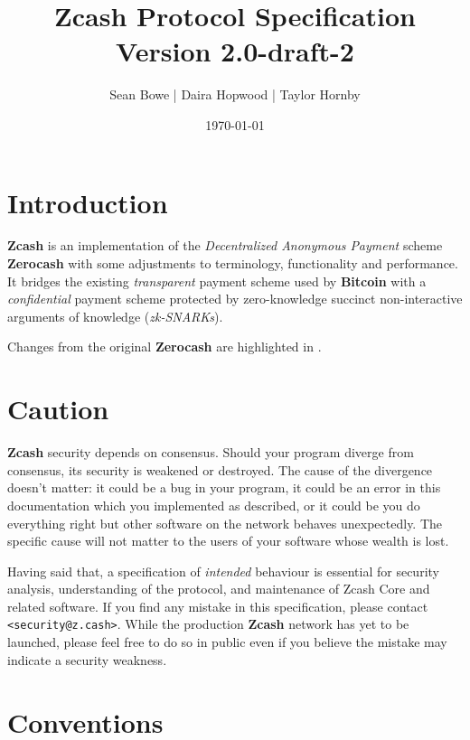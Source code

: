 \documentclass{article}
\newcommand{\changedcolor}{magenta}
\newcommand{\setchanged}{\color{\changedcolor}}
\newcommand{\changed}[1]{{\setchanged{#1}}}
\newcommand{\term}[1]{\textsl{#1}\xspace}
\newcommand{\termbf}[1]{\textbf{#1}\xspace}
\newcommand{\Zcash}{\termbf{Zcash}}
\newcommand{\Zerocash}{\termbf{Zerocash}}
\newcommand{\Bitcoin}{\termbf{Bitcoin}}
\newcommand{\zkSNARKs}{\term{zk-SNARKs}}
\begin{document}
\title{Zcash Protocol Specification \\
\Large Version 2.0-draft-2}
\author{Sean Bowe | Daira Hopwood | Taylor Hornby}
\date{\today}
\maketitle

\tableofcontents
\newpage


\section{Introduction}

\Zcash is an implementation of the \term{Decentralized Anonymous Payment}
scheme \Zerocash \cite{ZerocashOakland} with some adjustments to terminology,
functionality and performance. It bridges the existing \emph{transparent}
payment scheme used by \Bitcoin with a \emph{confidential} payment scheme
protected by zero-knowledge succinct non-interactive arguments of knowledge
(\zkSNARKs).

Changes from the original \Zerocash are highlighted in \changed{\changedcolor}.


\section{Caution}

\Zcash security depends on consensus. Should your program diverge from
consensus, its security is weakened or destroyed. The cause of the divergence
doesn't matter: it could be a bug in your program, it could be an error in
this documentation which you implemented as described, or it could be you do
everything right but other software on the network behaves unexpectedly. The
specific cause will not matter to the users of your software whose wealth is
lost.

Having said that, a specification of \emph{intended} behaviour is essential
for security analysis, understanding of the protocol, and maintenance of
Zcash Core and related software. If you find any mistake in this specification,
please contact \texttt{<security@z.cash>}. While the production \Zcash network
has yet to be launched, please feel free to do so in public even if you believe
the mistake may indicate a security weakness.


\section{Conventions}
\end{document}
